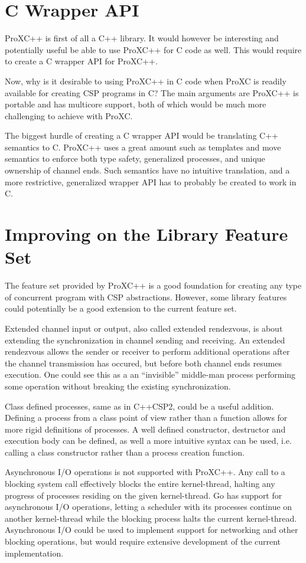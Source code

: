 \section{C Wrapper API}

ProXC++ is first of all a C++ library. It would however be interesting and potentially useful be able to use ProXC++ for C code as well. This would require to create a C wrapper API for ProXC++.

Now, why is it desirable to using ProXC++ in C code when ProXC is readily available for creating CSP programs in C? The main arguments are ProXC++ is portable and has multicore support, both of which would be much more challenging to achieve with ProXC. 

The biggest hurdle of creating a C wrapper API would be translating C++ semantics to C. ProXC++ uses a great amount such as templates and move semantics to enforce both type safety, generalized processes, and unique ownership of channel ends. Such semantics have no intuitive translation, and a more restrictive, generalized wrapper API has to probably be created to work in C.


\section{Improving on the Library Feature Set}

The feature set provided by ProXC++ is a good foundation for creating any type of concurrent program with CSP abstractions. However, some library features could potentially be a good extension to the current feature set.

Extended channel input or output, also called extended rendezvous, is about extending the synchronization in channel sending and receiving. An extended rendezvous allows the sender or receiver to perform additional operations after the channel transmission has occured, but before both channel ends resumes execution. One could see this as a an ``invisible'' middle\hyp{}man process performing some operation without breaking the existing synchronization.

Class defined processes, same as in C++CSP2, could be a useful addition. Defining a process from a class point of view rather than a function allows for more rigid definitions of processes. A well defined constructor, destructor and execution body can be defined, as well a more intuitive syntax can be used, i.e. calling a class constructor rather than a process creation function.

Asynchronous I/O operations is not supported with ProXC++. Any call to a blocking system call effectively blocks the entire kernel\hyp{}thread, halting any progress of processes residing on the given kernel\hyp{}thread. Go has support for asynchronous I/O operations, letting a scheduler with its processes continue on another kernel\hyp{}thread while the blocking process halts the current kernel\hyp{}thread. Asynchronous I/O could be used to implement support for networking and other blocking operations, but would require extensive development of the current implementation.

